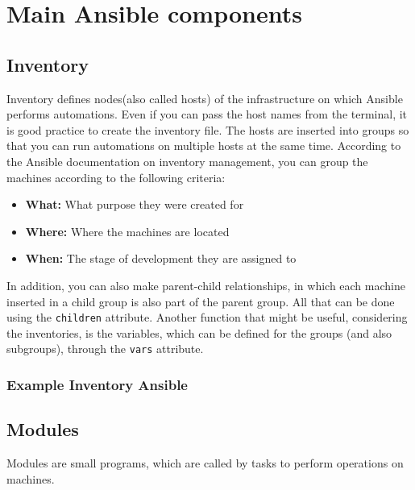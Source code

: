 \documentclass[12pt,a4paper,openright,twoside]{book}
\begin{document}
\section{Main Ansible components}

\subsection{Inventory}
Inventory defines nodes(also called hosts) of the infrastructure on which Ansible performs automations. Even if you can pass the host names from the terminal, it is good practice to create the inventory file.
The hosts are inserted into groups so that you can run automations on multiple hosts at the same time.
According to the Ansible documentation on inventory management\cite{ansibleDocInventory}, you can group the machines according to the following criteria:
            
            \begin{itemize}
                \item \textbf{What:} What purpose they were created for
                \item \textbf{Where:} Where the machines are located
                \item \textbf{When:} The stage of development they are assigned to
            \end{itemize}
            
            In addition, you can also make parent-child relationships, in which each machine inserted in a child group is also part of the parent group. All that can be done using the \texttt{children} attribute.
            Another function that might be useful, considering the inventories, is the variables, which can be defined for the groups (and also subgroups), through the \texttt{vars} attribute.

\subsubsection{Example Inventory Ansible}



\subsection{Modules}
Modules are small programs, which are called by tasks to perform operations on machines.
\end{document}
